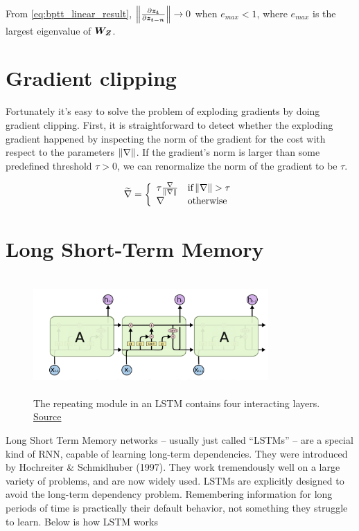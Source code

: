 From \cref{eq:bptt_linear_result}, $\norm{\frac{\partial \vect{z_t}}{\partial \vect{z_{t-n}}}} \rightarrow 0$ when $e_{max} < 1$, where $e_{max}$ is the largest eigenvalue of $\matr{W_Z}$.

\section{Gradient clipping}
Fortunately it's easy to solve the problem of exploding gradients by doing gradient clipping.
First, it is straightforward to detect whether the exploding gradient happened by inspecting the norm of the gradient for the cost with respect to the parameters $\norm{\nabla}$.
If the gradient's norm is larger than some predefined threshold $\tau > 0$, we can renormalize the norm of the gradient to be $\tau$.

\[
\widetilde{\nabla}=\left\{
            \begin{array}{ll}
              \tau\frac{\nabla}{\norm{\nabla}} & \text{if}  \norm{\nabla}>\tau\\
              \nabla & \text{otherwise}
            \end{array}
          \right.
\]

\section{Long Short-Term Memory}

\begin{figure}[h]
  \centering
      \includegraphics[width=0.8\textwidth,height=4.5cm]{lectures/06-b-rnn/image/lstm.png}
          \caption{
            The repeating module in an LSTM contains four interacting layers.
            \href{http://colah.github.io/posts/2015-08-Understanding-LSTMs/}{Source}
          }
          \label{fig:lstm}
\end{figure}

Long Short Term Memory networks – usually just called “LSTMs” – are a special kind of RNN, capable of learning long-term dependencies. 
They were introduced by Hochreiter \& Schmidhuber (1997). They work tremendously well on a large variety of problems, and are now widely used.
LSTMs are explicitly designed to avoid the long-term dependency problem. 
Remembering information for long periods of time is practically their default behavior, not something they struggle to learn. Below is how LSTM works

